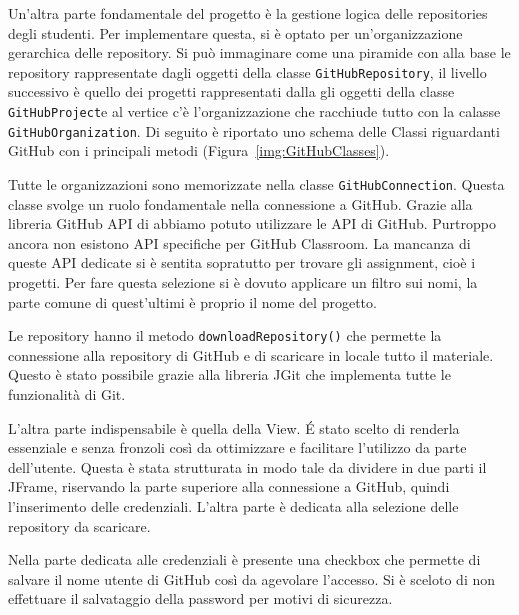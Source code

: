 		Un'altra parte fondamentale del progetto è la gestione logica delle repositories degli studenti.
		Per implementare questa, si è optato per un'organizzazione gerarchica delle repository.
		Si può immaginare come una piramide con alla base le repository rappresentate dagli oggetti della classe \verb|GitHubRepository|, il livello successivo è quello dei progetti rappresentati dalla gli oggetti della classe \verb|GitHubProject|e al vertice c'è l'organizzazione che racchiude tutto con la calasse \verb|GitHubOrganization|.
		Di seguito è riportato uno schema delle Classi riguardanti GitHub con i principali metodi (Figura~\ref{img:GitHubClasses}).
		
		\begin{center}
			\label{img:GitHubClasses}
		\end{center}
		
		
		Tutte le organizzazioni sono memorizzate nella classe \verb|GitHubConnection|.
		Questa classe svolge un ruolo fondamentale nella connessione a GitHub. Grazie alla libreria GitHub API di \citep{GitHubAPI} abbiamo potuto utilizzare le API di GitHub.
		Purtroppo ancora non esistono API specifiche per GitHub Classroom. La mancanza di queste API dedicate si è sentita sopratutto per trovare gli assignment, cioè i progetti. Per fare questa selezione si è dovuto applicare un filtro sui nomi, la parte comune di quest'ultimi è proprio il nome del progetto.
		
		Le repository hanno il metodo \verb|downloadRepository()| che permette la connessione alla repository di GitHub e di scaricare in locale tutto il materiale. Questo è stato possibile grazie alla libreria JGit che implementa tutte le funzionalità di Git.
		
		L'altra parte indispensabile è quella della View.
		\'E stato scelto di renderla essenziale e senza fronzoli così da ottimizzare e facilitare l'utilizzo da parte dell'utente.
		Questa è stata strutturata in modo tale da dividere in due parti il JFrame, riservando la parte superiore alla connessione a GitHub, quindi l'inserimento delle credenziali. L'altra parte è dedicata alla selezione delle repository da scaricare.
		
		Nella parte dedicata alle credenziali è presente una checkbox che permette di salvare il nome utente di GitHub così da agevolare l'accesso. Si è sceloto di non effettuare il salvataggio della password per motivi di sicurezza.
		
